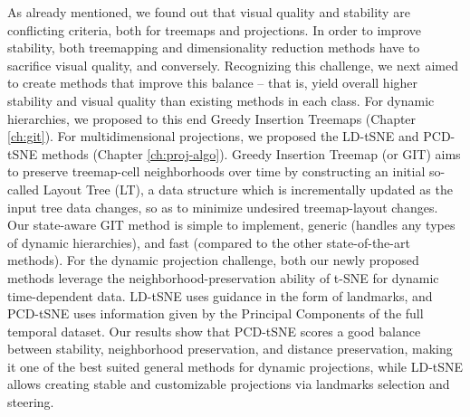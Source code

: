 As already mentioned, we found out that visual quality and stability are conflicting criteria, both for treemaps and projections. In order to improve stability, both treemapping and dimensionality reduction methods have to sacrifice visual quality, and conversely. Recognizing this challenge, we next aimed to create methods that improve this balance -- that is, yield overall higher stability and visual quality than existing methods in each class. For dynamic hierarchies, we proposed to this end Greedy Insertion Treemaps (Chapter \ref{ch:git}). For multidimensional projections, we proposed the LD-tSNE and PCD-tSNE methods (Chapter \ref{ch:proj-algo}). Greedy Insertion Treemap (or GIT) aims to preserve treemap-cell neighborhoods over time by constructing an initial so-called Layout Tree (LT), a data structure which is incrementally updated as the input tree data changes, so as to minimize undesired treemap-layout changes. Our state-aware GIT method is simple to implement, generic (handles any types of dynamic hierarchies), and fast (compared to the other state-of-the-art methods). For the dynamic projection challenge, both our newly proposed methods leverage the neighborhood-preservation ability of t-SNE for dynamic time-dependent data. LD-tSNE uses guidance in the form of landmarks, and PCD-tSNE uses information given by the Principal Components of the full temporal dataset. Our results show that PCD-tSNE scores a good balance between stability, neighborhood preservation, and distance preservation, making it one of the best suited general methods for dynamic projections, while LD-tSNE allows creating stable and customizable projections via landmarks selection and steering. 

